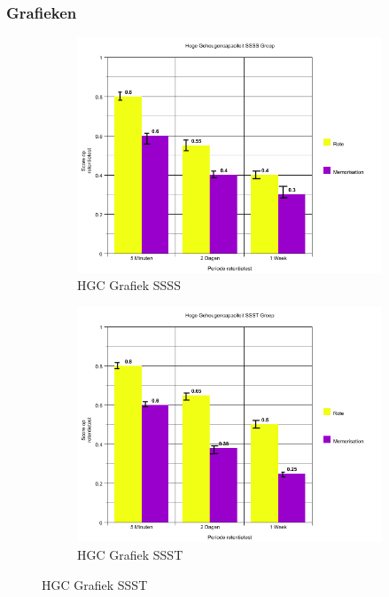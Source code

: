 \documentclass{hogent-article}
\begin{document}
\subsubsection{Grafieken}
\begin{figure}[H]
    \begin{subfigure}{0.45\textwidth}
        \includegraphics[width=\linewidth]{grafiek1}
        \caption{HGC Grafiek SSSS}
    \end{subfigure}
    \begin{subfigure}{0.45\textwidth}
        \includegraphics[width=\linewidth]{grafiek3}
        \caption{HGC Grafiek SSST}
    \end{subfigure}

\end{figure}
\end{document}
